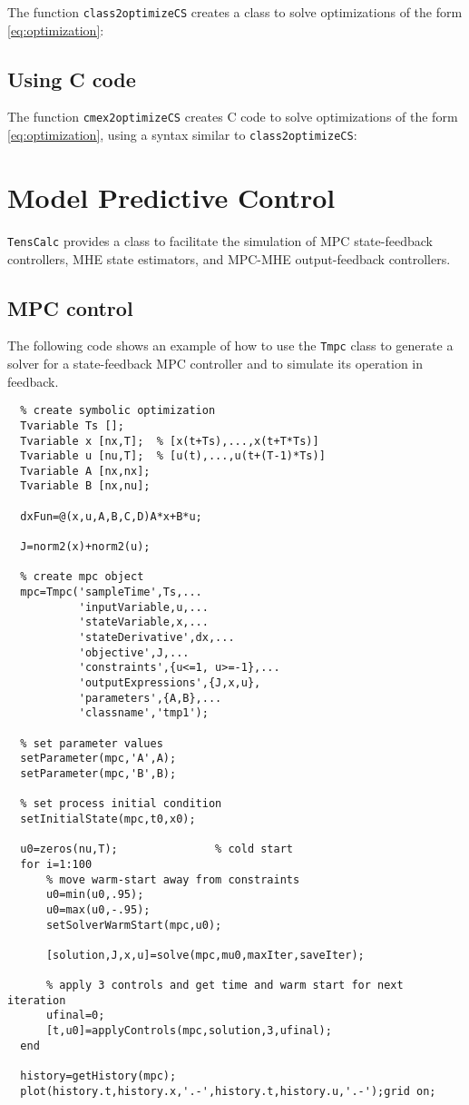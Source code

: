 \documentclass[11pt]{article}
\newcommand{\TC}{\texttt{TensCalc}}
\theoremstyle{remark}
\begin{document}
The function \lstinline{class2optimizeCS} creates a \matlab class to
solve optimizations of the form \eqref{eq:optimization}:



\subsection{Using C code}\label{se:optimization-C}

The function \lstinline{cmex2optimizeCS} creates C code to solve
optimizations of the form \eqref{eq:optimization}, using a syntax
similar to \lstinline{class2optimizeCS}:




\section{Model Predictive Control}

\TC{} provides a class to facilitate the simulation of MPC
state-feedback controllers, MHE state estimators, and MPC-MHE
output-feedback controllers.


\subsection{MPC control}

The following code shows an example of how to use the \lstinline{Tmpc}
class to generate a solver for a state-feedback MPC controller and to
simulate its operation in feedback.
\begin{lstlisting}
  % create symbolic optimization
  Tvariable Ts [];
  Tvariable x [nx,T];  % [x(t+Ts),...,x(t+T*Ts)]
  Tvariable u [nu,T];  % [u(t),...,u(t+(T-1)*Ts)]
  Tvariable A [nx,nx];
  Tvariable B [nx,nu];
  
  dxFun=@(x,u,A,B,C,D)A*x+B*u;

  J=norm2(x)+norm2(u);

  % create mpc object
  mpc=Tmpc('sampleTime',Ts,...
           'inputVariable,u,...
           'stateVariable,x,...
           'stateDerivative',dx,...
           'objective',J,...
           'constraints',{u<=1, u>=-1},...
           'outputExpressions',{J,x,u},
           'parameters',{A,B},...
           'classname','tmp1');

  % set parameter values
  setParameter(mpc,'A',A);
  setParameter(mpc,'B',B);
           
  % set process initial condition
  setInitialState(mpc,t0,x0);

  u0=zeros(nu,T);               % cold start
  for i=1:100
      % move warm-start away from constraints
      u0=min(u0,.95);
      u0=max(u0,-.95);
      setSolverWarmStart(mpc,u0);
    
      [solution,J,x,u]=solve(mpc,mu0,maxIter,saveIter);
    
      % apply 3 controls and get time and warm start for next iteration
      ufinal=0;
      [t,u0]=applyControls(mpc,solution,3,ufinal); 
  end

  history=getHistory(mpc);
  plot(history.t,history.x,'.-',history.t,history.u,'.-');grid on;
\end{lstlisting}
\end{document}
